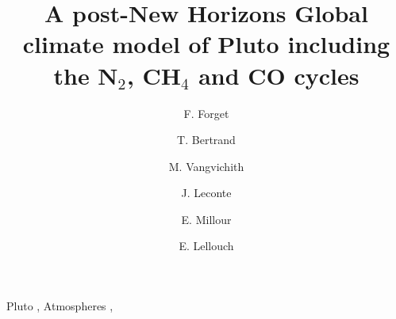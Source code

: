 \documentclass[final,authoryear,3p,times]{elsarticle}
\begin{document}
\begin{frontmatter}



\title{ 
A post-New Horizons Global climate model of Pluto including the N$_2$, CH$_4$ and CO cycles 
}



\author[lmd]{F. Forget}
\author[lmd]{T. Bertrand}
\author[lmd]{M. Vangvichith}
\author[lmd]{J. Leconte }
\author[lmd]{E. Millour}
\author[lesia]{E. Lellouch}



\address[lmd]{
Laboratoire de M\'et\'eorologie Dynamique (LMD/IPSL), CNRS,
Sorbonne Universit\'es, UPMC Univ Paris 06, Paris, France}

\address[lesia]{
Laboratoire {d'Etudes} Spatiales et {d'Instrumentation} en Astrophysique (LESIA), Observatoire de
Paris, CNRS, UPMC, Universit\'e Paris Diderot, F-92195 Meudon, France
}


\begin{abstract}
 


\end{abstract}

\begin{keyword}


Pluto
\sep
Atmospheres
\sep

\end{keyword}

\end{frontmatter}
\end{document}
